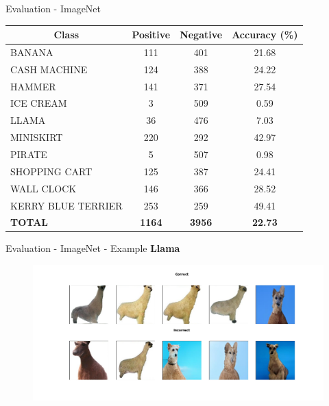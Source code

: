 \documentclass[t]{beamer}
\begin{document}
\begin{frame}[c]{Evaluation - ImageNet}
\fontsize{9}{6}\selectfont
\begin{table}[h!]
\begin{tabular}{|l|c|c|c|}
\hline
\multicolumn{1}{|c|}{\textbf{Class}} & \textbf{Positive} & \textbf{Negative} & \textbf{Accuracy (\%)}       \\ \hline
BANANA                               & 111               & 401               & {\color[HTML]{000000} 21.68} \\ \hline
CASH MACHINE                         & 124               & 388               & 24.22                        \\ \hline
HAMMER                               & 141               & 371               & 27.54                        \\ \hline
ICE CREAM                            & 3                 & 509               & {\color[HTML]{FE0000} 0.59}  \\ \hline
LLAMA                                & 36                & 476               & {\color[HTML]{333333} 7.03}  \\ \hline
MINISKIRT                            & 220               & 292               & 42.97                        \\ \hline
PIRATE                               & 5                 & 507               & 0.98                         \\ \hline
SHOPPING CART                        & 125               & 387               & 24.41                        \\ \hline
WALL CLOCK                           & 146               & 366               & 28.52                        \\ \hline
KERRY BLUE TERRIER                   & 253               & 259               & {\color[HTML]{32CB00} 49.41} \\ \hline
\textbf{TOTAL}                       & \textbf{1164}     & \textbf{3956}     & \textbf{22.73}               \\ \hline
\end{tabular}
\end{table}
\end{frame}

\begin{frame}[c]{Evaluation - ImageNet - Example}
\textbf{Llama}
\begin{figure}
    \centering
    \includegraphics[scale=0.25]{llama.png}
\end{figure} 
\end{frame}
\end{document}
